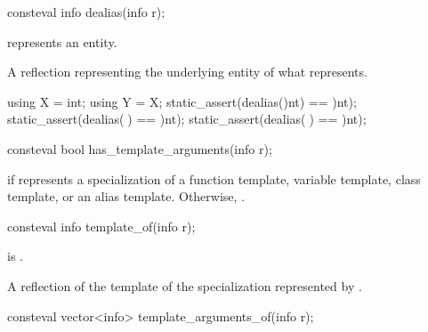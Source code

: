 %
\begin{itemdecl}
consteval info dealias(info r);
\end{itemdecl}

\begin{itemdescr}
\pnum
\constantwhen
{} represents an entity.

\pnum
\returns
A reflection representing the underlying entity of what  represents.
\begin{example}
\begin{codeblock}
using X = int;
using Y = X;
static_assert(dealias(^^int) == ^^int);
static_assert(dealias(^^X) == ^^int);
static_assert(dealias(^^Y) == ^^int);
\end{codeblock}
\end{example}
\end{itemdescr}

%
\begin{itemdecl}
consteval bool has_template_arguments(info r);
\end{itemdecl}

\begin{itemdescr}
\pnum
\returns
{} if  represents a specialization of a
function template,
variable template,
class template, or
an alias template.
Otherwise, .
\end{itemdescr}

%
\begin{itemdecl}
consteval info template_of(info r);
\end{itemdecl}

\begin{itemdescr}
\pnum
\constantwhen
{} is .

\pnum
\returns
A reflection of the template of the specialization represented by .
\end{itemdescr}

%
\begin{itemdecl}
consteval vector<info> template_arguments_of(info r);
\end{itemdecl}

